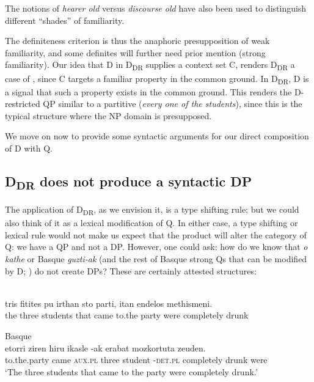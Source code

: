 \documentclass[output=paper,
modfonts
]{langscibook}
\begin{document}
The notions of \textit{hearer old} versus \textit{discourse old} have also been used \citep{Prince1981,WardBirner1995} to distinguish different ``shades'' of familiarity.

The definiteness criterion is thus the anaphoric presupposition of weak familiarity, and some definites will further need prior mention (strong familiarity).  Our idea that D in D\textsubscript{DR} supplies a context set C, renders D\textsubscript{DR} a case of , since C targets a familiar property in the common ground. In D\textsubscript{DR}, D is a signal that such a property exists in the common ground. This renders the D-restricted QP similar to a partitive (\textit{every one of the students}), since this is the typical structure where the NP domain is presupposed. 

We move on now to provide some syntactic arguments for our direct composition of D with Q.

\subsection{D\textsubscript{DR} does not produce a syntactic DP}

The application of D\textsubscript{DR}, as we envision it, is a type shifting rule; but we could also think of it as a lexical modification of Q. In either case, a type shifting or lexical rule would not make us expect that the product will alter the category of Q: we have a QP and not a DP. However, one could ask: how do we know that  \textit{o kathe} or Basque \textit{guzti-ak} (and the rest of Basque strong Qs that can be modified by D; \citealt{etxeberria2005, etxeberria2009}) do not create DPs? These are certainly attested structures:

\ea\label{ex:etxeberria:24}
	\ea
		\\
		 {\ob}{tris} {fitites} {pu} {irthan} {sto} {parti}{\cb}{\cb}, {itan} {endelos} {methismeni}.\\
		{\ob}the {\ob}three students that came to.the party{\cb}{\cb} were completely drunk\\
	
	\ex
		Basque\\
		 {etorri} {ziren} {hiru} {ikasle}{\cb} {-ak}{\cb} {erabat} {mozkortuta} {zeuden}.\\
		{\ob}to.the.party  came \textsc{aux.pl} three student{\cb} -\textsc{det.pl}{\cb} completely drunk were\\
		\glt `The three students that came to the party were completely drunk.'
	\z
\z
\end{document}
